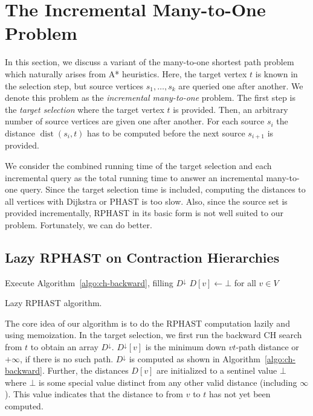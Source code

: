\documentclass[manuscript,review]{acmart}
\newcommand*{\dist}{\operatorname{dist}}
\newcommand*{\echu}{E^{\uparrow}}
\begin{document}
\section{The Incremental Many-to-One Problem}\label{sec:lazy-rphast}

In this section, we discuss a variant of the many-to-one shortest path problem which naturally arises from A* heuristics.
Here, the target vertex $t$ is known in the selection step, but source vertices $s_1,\dots,s_k$ are queried one after another.
We denote this problem as the \emph{incremental many-to-one} problem.
The first step is the \emph{target selection} where the target vertex $t$ is provided.
Then, an arbitrary number of source vertices are given one after another.
For each source $s_i$ the distance $\dist(s_i, t)$ has to be computed before the next source $s_{i+1}$ is provided.

We consider the combined running time of the target selection and each incremental query as the total running time to answer an incremental many-to-one query.
Since the target selection time is included, computing the distances to all vertices with Dijkstra or PHAST is too slow.
Also, since the source set is provided incrementally, RPHAST in its basic form is not well suited to our problem.
Fortunately, we can do better.

\subsection{Lazy RPHAST on Contraction Hierarchies}

\begin{algorithm2e}[tb]

Execute Algorithm~\ref{algo:ch-backward}, filling $D^{\downarrow}$\;
$D[v] \gets \bot$ for all $v \in V$\;

\Fn{\Dist{$u$}}{
	\If{$D[u] = \bot$}{
		$D[u]\leftarrow D^{\downarrow}[u]$\;
		\For{all up-edges $uv \in \echu$}{
      $D[u]\leftarrow\min(D[u],w(uv)+\Dist(v))$\;
		}
	}
	\Return{$D[u]$}\;
}
\caption{Lazy RPHAST algorithm.}
\label{algo:lazy_rphast_ch}
\end{algorithm2e}

The core idea of our algorithm is to do the RPHAST computation lazily and using memoization.
In the target selection, we first run the backward CH search from $t$ to obtain an array $D^{\downarrow}$.
$D^{\downarrow}[v]$ is the minimum down $vt$-path distance or $+\infty$, if there is no such path.
$D^{\downarrow}$ is computed as shown in Algorithm~\ref{algo:ch-backward}.
Further, the distances $D[v]$ are initialized to a sentinel value $\bot$ where $\bot$ is some special value distinct from any other valid distance (including $\infty$).
This value indicates that the distance to from $v$ to $t$ has not yet been computed.
\end{document}
